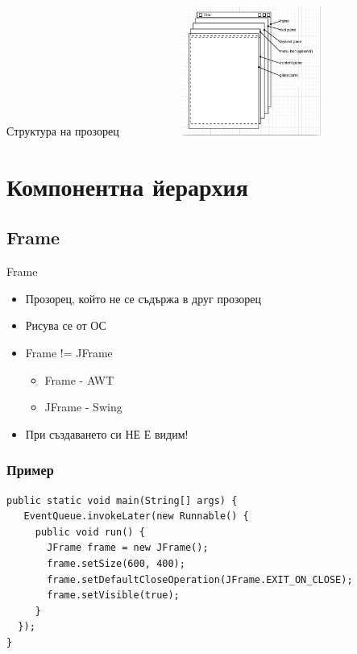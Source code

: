 \documentclass{beamer}
\begin{document}
\begin{frame}{Структура на прозорец}
  \transdissolve
  \includegraphics[width=320px,height=160px]{images/jframe.png}  
\end{frame}

\section{Компонентна йерархия}
\subsection{Frame}
\begin{frame}{Frame}
  \transdissolve
  \begin{itemize}
  \item Прозорец, който не се съдържа в друг прозорец
  \item Рисува се от ОС
  \item Frame != JFrame
    \begin{itemize}
      \item Frame - AWT
      \item JFrame - Swing
    \end{itemize}
    \item При създаването си НЕ Е видим!
  \end{itemize}
\end{frame}

\begin{frame}[fragile]
  \frametitle{Пример}
  \transdissolve
\begin{lstlisting}
public static void main(String[] args) {
   EventQueue.invokeLater(new Runnable() {
     public void run() {  
       JFrame frame = new JFrame();
       frame.setSize(600, 400);
       frame.setDefaultCloseOperation(JFrame.EXIT_ON_CLOSE);
       frame.setVisible(true);
     }
  });
}
\end{lstlisting}
\end{frame}
\end{document}
